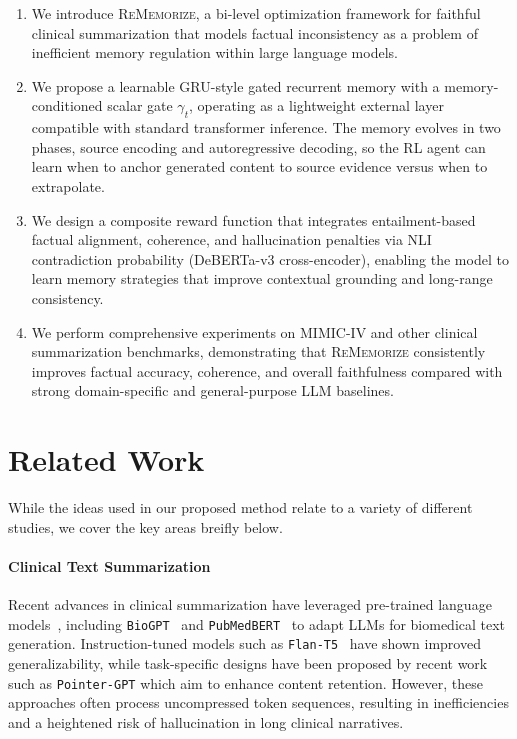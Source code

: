 \documentclass{article}
\begin{document}
\begin{enumerate}
\item We introduce \textsc{ReMemorize}, a bi-level optimization framework for faithful clinical summarization that models factual inconsistency as a problem of inefficient memory regulation within large language models.
\item We propose a learnable GRU-style gated recurrent memory with a memory-conditioned scalar gate $\gamma_t$, operating as a lightweight external layer compatible with standard transformer inference. The memory evolves in two phases, source encoding and autoregressive decoding, so the RL agent can learn when to anchor generated content to source evidence versus when to extrapolate.
\item We design a composite reward function that integrates entailment-based factual alignment, coherence, and hallucination penalties via NLI contradiction probability (DeBERTa-v3 cross-encoder), enabling the model to learn memory strategies that improve contextual grounding and long-range consistency.
\item We perform comprehensive experiments on MIMIC-IV and other clinical summarization benchmarks, demonstrating that \textsc{ReMemorize} consistently improves factual accuracy, coherence, and overall faithfulness compared with strong domain-specific and general-purpose LLM baselines.
\end{enumerate}


\section{Related Work}
While the ideas used in our proposed method relate to a variety of different studies, we cover the key areas breifly below.  

\paragraph{Clinical Text Summarization}
Recent advances in clinical summarization have leveraged pre-trained language models~\citep{piya2025advancing}, including \texttt{BioGPT}~\citep{luo2022biogpt} and \texttt{PubMedBERT}~\citep{gu2021domain} to adapt LLMs for biomedical text generation. Instruction-tuned models such as \texttt{Flan-T5}~\citep{lyu2024automatic} have shown improved generalizability, while task-specific designs have been proposed by recent work~\citep{han2024optimal} such as \texttt{Pointer-GPT} which aim to enhance content retention. However, these approaches often process uncompressed token sequences, resulting in inefficiencies and a heightened risk of hallucination in long clinical narratives.
\end{document}
